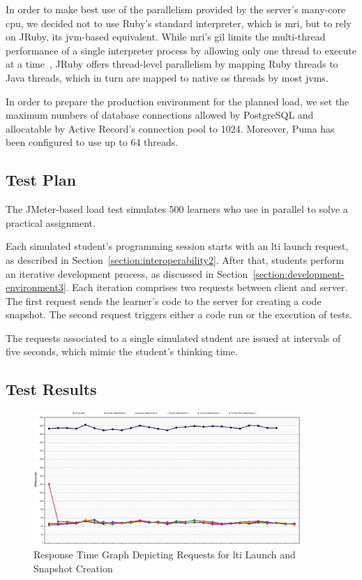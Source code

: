 In order to make best use of the parallelism provided by the server's many-core \gls{cpu}, we decided not to use Ruby's standard interpreter, which is \gls{mri}, but to rely on JRuby, its \gls{jvm}-based equivalent. While \gls{mri}'s \gls{gil} limits the multi-thread performance of a single interpreter process by allowing only one thread to execute at a time~\cite{odaira2014eliminating}, JRuby offers thread-level parallelism by mapping Ruby threads to Java threads, which in turn are mapped to native \gls{os} threads by most \glspl{jvm}.

In order to prepare the production environment for the planned load, we set the maximum numbers of database connections allowed by PostgreSQL and allocatable by Active Record's connection pool to 1024. Moreover, Puma has been configured to use up to 64 threads.

\subsection{Test Plan}

The JMeter-based load test simulates 500 learners who use \tool in parallel to solve a practical assignment.

Each simulated student's programming session starts with an \gls{lti} launch request, as described in Section~\ref{section:interoperability2}. After that, students perform an iterative development process, as discussed in Section~\ref{section:development-environment3}. Each iteration comprises two requests between client and server. The first request sends the learner's code to the server for creating a code snapshot. The second request triggers either a code run or the execution of tests.

The requests associated to a single simulated student are issued at intervals of five seconds, which mimic the student's thinking time.

\subsection{Test Results}

\begin{figure}[h]
\centering
\hspace{-0.5cm}
\includegraphics[width=0.9\textwidth]{images/jmeter1.png}
\caption{Response Time Graph Depicting Requests for \gls{lti} Launch and Snapshot Creation}
\label{figure:jmeter1}
\end{figure}

